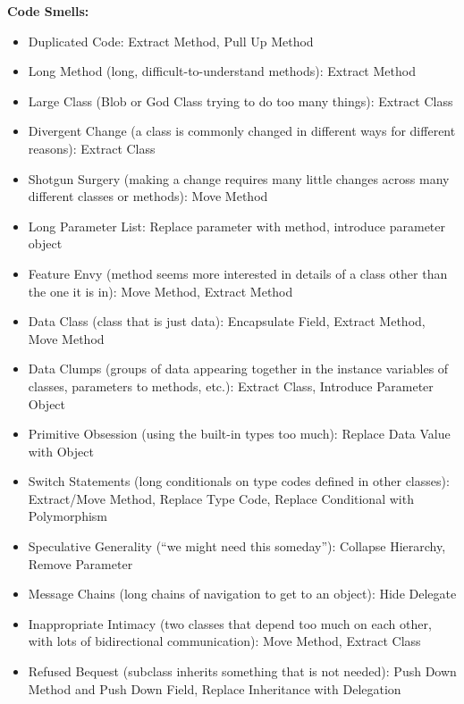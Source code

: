 \documentclass[8pt, letterpaper, titlepage]{article}
\begin{document}
\begin{multicols*}{2}
\textbf{Code Smells:}
\begin{itemize}
    \item Duplicated Code: Extract Method, Pull Up Method
    \item Long Method (long, difficult-to-understand methods): Extract Method
    \item Large Class (Blob or God Class trying to do too many things): Extract Class
    \item Divergent Change (a class is commonly changed in different ways for different reasons): Extract Class
    \item Shotgun Surgery (making a change requires many little changes across many different classes or methods): Move Method
    \item Long Parameter List: Replace parameter with method, introduce parameter object
    \item Feature Envy (method seems more interested in details of a class other than the one it is in): Move Method, Extract Method 
    \item Data Class (class that is just data): Encapsulate Field, Extract Method, Move Method 
    \item Data Clumps (groups of data appearing together in the instance variables of classes, parameters to methods, etc.): Extract Class, Introduce Parameter Object 
    \item Primitive Obsession (using the built-in types too much): Replace Data Value with Object
    \item Switch Statements (long conditionals on type codes defined in other classes): Extract/Move Method, Replace Type Code, Replace Conditional with Polymorphism
    \item Speculative Generality (``we might need this someday''): Collapse Hierarchy, Remove Parameter
    \item Message Chains (long chains of navigation to get to an object): Hide Delegate
    \item Inappropriate Intimacy (two classes that depend too much on each other, with lots of bidirectional communication): Move Method, Extract Class 
    \item Refused Bequest (subclass inherits something that is not needed): Push Down Method and Push Down Field, Replace Inheritance with Delegation
\end{itemize}

\normalsize
\end{multicols*}

\newpage
\end{document}
